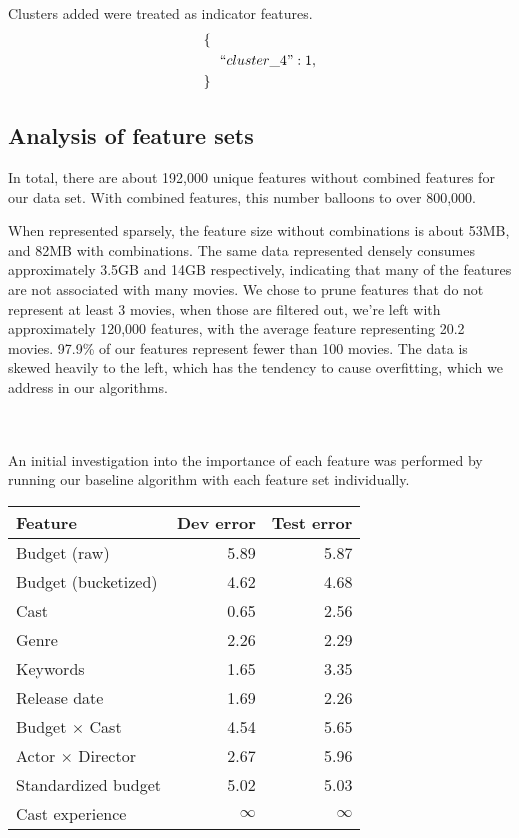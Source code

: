 \documentclass[journal]{IEEEtran}
\begin{document}
Clusters added were treated as indicator features.
\begin{align*}
        \{\ \ &\\
        &``cluster\_4": 1,\\
        \}\ \ &
\end{align*}

\subsection{Analysis of feature sets}
In total, there are about 192,000 unique features without combined features for
our data set.  With combined features, this number balloons to over 800,000.
\begin{center}
\end{center}

When represented sparsely, the feature size without combinations is about 53MB, and 82MB with combinations.  The same data represented
densely consumes approximately 3.5GB and 14GB respectively, indicating that many of the features are not associated with many movies.  We chose to prune features that do not represent at least 3 movies, when
those are filtered out, we're left with approximately 120,000 features, with the average feature
representing 20.2 movies. 97.9\% of our features represent fewer than 100 movies.  The data
is skewed heavily to the left, which has the tendency to cause overfitting, which we address in
our algorithms. \\
\\
\\
\par An initial investigation into the importance of each feature was performed by
running our baseline algorithm with each feature set individually.\\

\begin{center}
\begin{tabular}{|l|r r|} %
\hline
Feature & Dev error & Test error \\ [0.5ex] %
\hline %
Budget (raw) & 5.89 & 5.87 \\ %
Budget (bucketized) & 4.62 & 4.68 \\
Cast & 0.65 & 2.56 \\
Genre & 2.26 & 2.29 \\
Keywords & 1.65 & 3.35 \\
Release date & 1.69 & 2.26 \\
\hline
Budget $\times$ Cast & 4.54 & 5.65 \\
Actor $\times$ Director & 2.67 & 5.96 \\
\hline
Standardized budget & 5.02 & 5.03 \\
Cast experience & $\infty$ & $\infty$ \\
\hline
\end{tabular}
\end{center}
\smallskip
\end{document}
